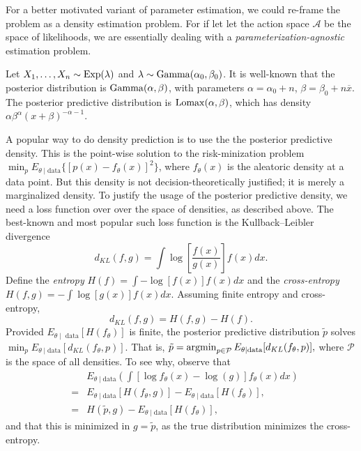 For a better motivated variant of parameter estimation, we could re-frame the problem as a density estimation problem. For if let let the action space $\mathcal{A}$ be the space of likelihoods, we are essentially dealing with a \emph{parameterization-agnostic} estimation problem. 
\begin{example}
\label{exa:exponential estimation} Let $X_{1},\ldots,X_{n}\sim\operatorname{Exp}(\lambda)$
and $\lambda\sim\operatorname{Gamma}(\alpha_{0},\beta_{0})$. It is well-known
that the posterior distribution is $\operatorname{Gamma}(\alpha,\beta)$, with
parameters $\alpha=\alpha_{0}+n$, $\beta=\beta_{0}+n\overline{x}$.
The posterior predictive distribution is $\operatorname{Lomax}(\alpha,\beta)$,
which has density $\alpha\beta^{\alpha}(x+\beta)^{-\alpha-1}$. 

A popular way to do density prediction is to use the the posterior
predictive density. This\emph{ }is the point-wise solution to the
risk-minization problem $\min_{p}E_{\theta\mid\textrm{data}}\{[p(x)-f_{\theta}(x)]^{2}\}$,
where $f_{\theta}(x)$ is the aleatoric density at a data point. But
this density is not decision-theoretically justified; it is merely
a marginalized density. To justify the usage of the posterior predictive
density, we need a loss function over over the space of densities, as described above.
The best-known and most popular such loss function is the Kullback--Leibler\emph{
}divergence 
\begin{equation}
d_{KL}(f,g)=\int\log\left[\frac{f(x)}{g(x)}\right]f(x)dx.\label{eq:Kullback-Leibler}
\end{equation}
 Define the \emph{entropy} $H(f)=\int-\log[f(x)]f(x)dx$ and the \emph{cross-entropy}
$H(f,g)=-\int\log[g(x)]f(x)dx$. Assuming finite entropy and cross-entropy,
\begin{equation}
d_{KL}(f,g)=H(f,g)-H(f).\label{eq:Kullback--Leibler(entropy)}
\end{equation}
Provided $E_{\theta\mid\textrm{ data}}[H(f_{\theta})]$ is finite,
the posterior predictive distribution $\tilde{p}$ solves $\min_{p}E_{\theta\mid\textrm{data}}[d_{KL}(f_{\theta},p)]$.
That is, $\tilde{p}=\operatorname{argmin}_{p\in\mathcal{P}}E_{\theta\mid\textrm{data}}[d_{KL}(f_{\theta},p)],$
where $\mathcal{P}$ is the space of all densities. To see why, observe
that
\begin{eqnarray}
 &  & E_{\theta\mid\textrm{data}}\left(\int[\log f_{\theta}(x)-\log(g)]f_{\theta}(x)dx\right)\nonumber \\  
 & = & E_{\theta\mid\textrm{data}}[H(f_{\theta},g)]-E_{\theta\mid\textrm{data}}[H(f_{\theta})],\label{eq:cross-entropy equality}\\
 & = & H(\tilde{p},g)-E_{\theta\mid\textrm{data}}[H(f_{\theta})],\nonumber 
\end{eqnarray}
and that this is minimized in $g=\tilde{p}$, as the true distribution
minimizes the cross-entropy. 


\end{example}
